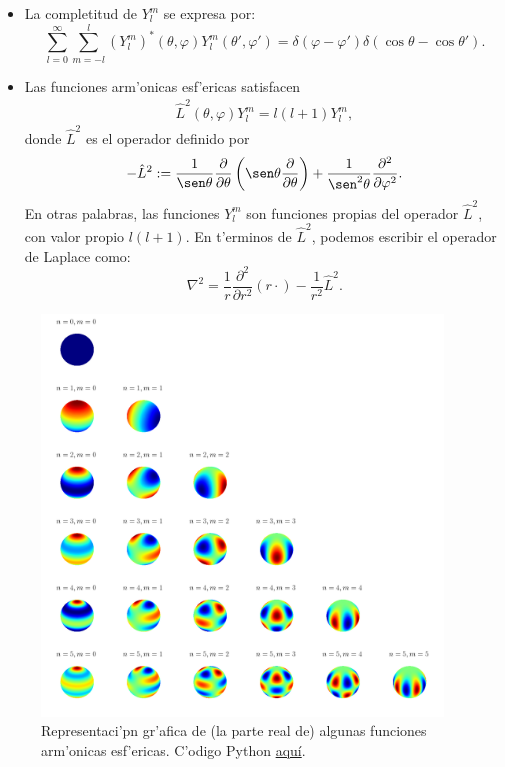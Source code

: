 \begin{itemize}
\item La completitud de $Y_l^m $ se expresa por:
\begin{equation}
    \sum_{l=0}^\infty\sum_{m=-l}^l (Y_l^m)^*(\theta,\varphi)
    Y_l^m (\theta',\varphi') = \delta(\varphi-\varphi')\delta(\cos\theta-
    \cos\theta').
\end{equation}
\item Las  funciones arm'onicas esf'ericas satisfacen
 \begin{eqnarray}
  \hat{L}^2(\theta,\varphi) Y_l^m  = l(l+1)Y_l^m ,
 \end{eqnarray}
donde $\hat{L}^2$ es el operador definido por
 \begin{eqnarray}
  -\hat{L}^2 :=
\frac{1}{\sen\theta}\frac{\partial}{\partial\theta}\left(\sen\theta\frac{
\partial}{\partial
  \theta}\right)+\frac 1{\sen^2\theta}\frac{\partial^2}{\partial \varphi^2}.
 \end{eqnarray}
 En otras palabras, las funciones $Y_l^m $ son funciones propias del operador
$\hat{L}^2$, con valor propio $l(l+1)$. En t'erminos de $\hat{L}^2$, podemos
escribir el operador de Laplace como:
 \begin{equation}
  \nabla^2 = \frac 1r\frac{\partial^2}{\partial r^2}\left( r \cdot\right) -
\frac{1}{r^2}\hat{L}^2.
\end{equation}
 \end{itemize}

\begin{figure}[H]
\centering
\includegraphics[angle=0,width=0.95\textwidth]{figs/fig-Aes3Dcolores.png}
\caption{Representaci'pn gr'afica de (la parte real de) algunas funciones arm'onicas esf'ericas. C'odigo Python \href{https://github.com/gfrubi/FM2/blob/master/figuras-editables/Graficos-AE-esfera-colores.py}{aqu\'i}.}
\label{fig-Aes}
\end{figure}

